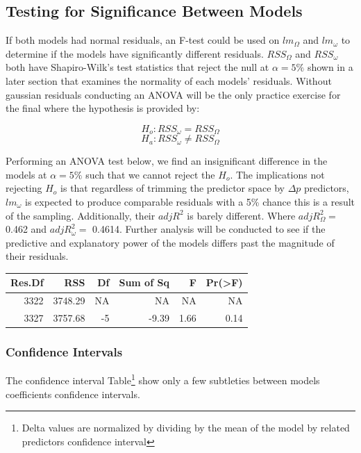 \documentclass[]{article}
\begin{document}
\hypertarget{testing-for-significance-between-models}{%
\subsection{Testing for Significance Between
Models}\label{testing-for-significance-between-models}}

If both models had normal residuals, an F-test could be used on
\(lm_\Omega\) and \(lm_\omega\) to determine if the models have
significantly different residuals. \(RSS_\Omega\) and \(RSS_\omega\)
both have Shapiro-Wilk's test statistics that reject the null at
\(\alpha=5\%\) shown in a later section that examines the normality of
each models' residuals. Without gaussian residuals conducting an ANOVA
will be the only practice exercise for the final where the hypothesis is
provided by:

\[ H_o:RSS_\omega = RSS_\Omega\] \[ H_a:RSS_\omega \neq RSS_\Omega\]

Performing an ANOVA test below, we find an insignificant difference in
the models at \(\alpha=5\%\) such that we cannot reject the \(H_o\). The
implications not rejecting \(H_o\) is that regardless of trimming the
predictor space by \(\Delta p\) predictors, \(lm_\omega\) is expected to
produce comparable residuals with a 5\% chance this is a result of the
sampling. Additionally, their \(adjR^2\) is barely different. Where
\(adjR^2_\Omega=\) 0.462 and \(adjR^2_\omega=\) 0.4614. Further analysis
will be conducted to see if the predictive and explanatory power of the
models differs past the magnitude of their residuals.

\begin{longtable}[]{@{}rrrrrr@{}}
\toprule
Res.Df & RSS & Df & Sum of Sq & F & Pr(\textgreater{}F)\tabularnewline
\midrule
\endhead
3322 & 3748.29 & NA & NA & NA & NA\tabularnewline
3327 & 3757.68 & -5 & -9.39 & 1.66 & 0.14\tabularnewline
\bottomrule
\end{longtable}

\hypertarget{confidence-intervals}{%
\subsubsection{Confidence Intervals}\label{confidence-intervals}}

The confidence interval Table\footnote{Delta values are normalized by
  dividing by the mean of the model by related predictors confidence
  interval} show only a few subtleties between models coefficients
confidence intervals.
\end{document}
